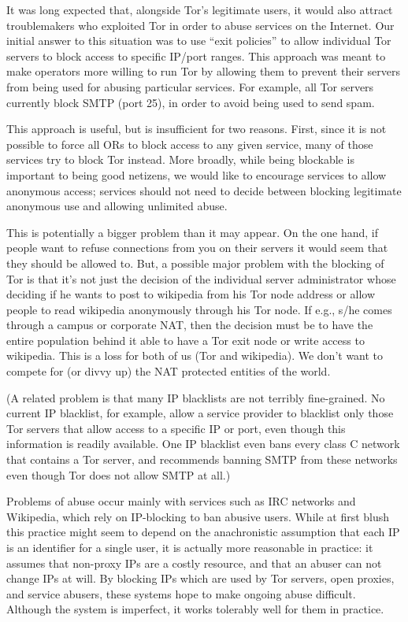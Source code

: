 \documentclass{llncs}
\begin{document}
It was long expected that, alongside Tor's legitimate users, it would also
attract troublemakers who exploited Tor in order to abuse services on the
Internet.  Our initial answer to this situation was to use ``exit policies''
to allow individual Tor servers to block access to specific IP/port ranges.
This approach was meant to make operators more willing to run Tor by allowing
them to prevent their servers from being used for abusing particular
services.  For example, all Tor servers currently block SMTP (port 25), in
order to avoid being used to send spam.

This approach is useful, but is insufficient for two reasons.  First, since
it is not possible to force all ORs to block access to any given service,
many of those services try to block Tor instead.  More broadly, while being
blockable is important to being good netizens, we would like to encourage
services to allow anonymous access; services should not need to decide
between blocking legitimate anonymous use and allowing unlimited abuse.

This is potentially a bigger problem than it may appear. 
On the one hand, if people want to refuse connections from you on
their servers it would seem that they should be allowed to.  But, a
possible major problem with the blocking of Tor is that it's not just
the decision of the individual server administrator whose deciding if
he wants to post to wikipedia from his Tor node address or allow
people to read wikipedia anonymously through his Tor node. If e.g.,
s/he comes through a campus or corporate NAT, then the decision must
be to have the entire population behind it able to have a Tor exit
node or write access to wikipedia. This is a loss for both of us (Tor
and wikipedia). We don't want to compete for (or divvy up) the NAT
protected entities of the world.

(A related problem is that many IP blacklists are not terribly fine-grained.
No current IP blacklist, for example, allow a service provider to blacklist
only those Tor servers that allow access to a specific IP or port, even
though this information is readily available.  One IP blacklist even bans
every class C network that contains a Tor server, and recommends banning SMTP
from these networks even though Tor does not allow SMTP at all.)

Problems of abuse occur mainly with services such as IRC networks and
Wikipedia, which rely on IP-blocking to ban abusive users.  While at first
blush this practice might seem to depend on the anachronistic assumption that
each IP is an identifier for a single user, it is actually more reasonable in
practice: it assumes that non-proxy IPs are a costly resource, and that an
abuser can not change IPs at will.  By blocking IPs which are used by Tor
servers, open proxies, and service abusers, these systems hope to make
ongoing abuse difficult.  Although the system is imperfect, it works
tolerably well for them in practice.
\end{document}
